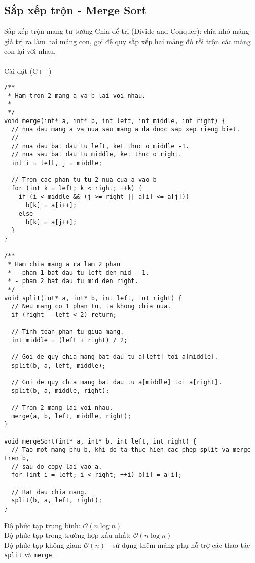 \documentclass[]{article}
\begin{document}
\subsection{Sắp xếp trộn - Merge Sort}
Sắp xếp trộn mang tư tưởng Chia để trị (Divide and Conquer): chia nhỏ mảng giá trị ra làm hai mảng con, gọi đệ quy sắp xếp hai mảng đó rồi trộn các mảng con lại với nhau.
\\\\
Cài đặt (C++)
\begin{lstlisting}
/**
 * Ham tron 2 mang a va b lai voi nhau.
 *
 */
void merge(int* a, int* b, int left, int middle, int right) {
  // nua dau mang a va nua sau mang a da duoc sap xep rieng biet.
  //
  // nua dau bat dau tu left, ket thuc o middle -1.
  // nua sau bat dau tu middle, ket thuc o right.
  int i = left, j = middle;

  // Tron cac phan tu tu 2 nua cua a vao b
  for (int k = left; k < right; ++k) {
    if (i < middle && (j >= right || a[i] <= a[j]))
      b[k] = a[i++];
    else
      b[k] = a[j++];
  }
}

/**
 * Ham chia mang a ra lam 2 phan
 * - phan 1 bat dau tu left den mid - 1.
 * - phan 2 bat dau tu mid den right.
 */
void split(int* a, int* b, int left, int right) {
  // Neu mang co 1 phan tu, ta khong chia nua.
  if (right - left < 2) return;

  // Tinh toan phan tu giua mang.
  int middle = (left + right) / 2;

  // Goi de quy chia mang bat dau tu a[left] toi a[middle].
  split(b, a, left, middle);

  // Goi de quy chia mang bat dau tu a[middle] toi a[right].
  split(b, a, middle, right);

  // Tron 2 mang lai voi nhau.
  merge(a, b, left, middle, right);
}

void mergeSort(int* a, int* b, int left, int right) {
  // Tao mot mang phu b, khi do ta thuc hien cac phep split va merge tren b,
  // sau do copy lai vao a.
  for (int i = left; i < right; ++i) b[i] = a[i];

  // Bat dau chia mang.
  split(b, a, left, right);
}
\end{lstlisting}
Độ phức tạp trung bình: $\mathcal{O}(n \log n)$
\\
Độ phức tạp trong trường hợp xấu nhất: $\mathcal{O}(n \log n)$
\\
Độ phức tạp không gian: $\mathcal{O}(n)$ - sử dụng thêm mảng phụ hỗ trợ các thao tác \texttt{split} và \texttt{merge}.
\end{document}
